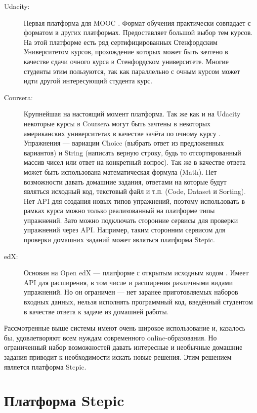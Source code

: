 \documentclass{matmex-diploma-custom}
\begin{document}
\begin{description}
\item[Udacity:] Первая платформа для MOOC \cite{udacity}. Формат
  обучения практически совпадает с форматом в других
  платформах. Предоставляет большой выбор тем курсов. На этой
  платформе есть ряд сертифицированных Стенфордским Университетом
  курсов, прохождение которых может быть зачтено в качестве сдачи
  очного курса в Стенфордском университете. Многие студенты этим
  пользуются, так как параллельно с очным курсом может идти другой
  интересующий студента курс.
\item[Coursera:] Крупнейшая на настоящий момент платформа. Так же как и
  на Udacity некоторые курсы в Coursera могут быть зачтены в некоторых
  американских университетах в качестве зачёта по очному курсу
  \cite{coursera}. Упражнения --- вариации Choice (выбрать ответ из
  предложенных вариантов) и String (написать верную строку, будь то
  отсортированный массив чисел или ответ на конкретный вопрос). Так же
  в качестве ответа может быть использована математическая формула
  (Math). Нет возможности давать домашние задания, ответами на которые
  будут являться исходный код, текстовый файл и т.п. (Code, Dataset и
  Sorting). Нет API для создания новых типов упражнений, поэтому
  использовать в рамках курса можно только реализованный на платформе
  типы упражнений. Зато можно подключать сторонние сервисы для
  проверки упражнений через API. Например, таким сторонним сервисом
  для проверки домашних заданий может являться платформа Stepic.
\item[edX:] Основан на Open edX --- платформе с открытым исходным кодом
  \cite{edx}. Имеет API для расширения, в том числе и расширения
  различными видами упражнений. Но он ограничен --- нет заранее
  приготовляемых наборов входных данных, нельзя исполнять программный
  код, введённый студентом в качестве ответа к задаче из домашней
  работы.
\end{description}

Рассмотренные выше системы имеют очень широкое использование и,
казалось бы, удовлетворяют всем нуждам современного
online-образования. Но ограниченный набор возможностей давать
интересные и необычные домашние задания приводит к необходимости
искать новые решения. Этим решением является платформа Stepic.

\section{Платформа Stepic}
\end{document}
